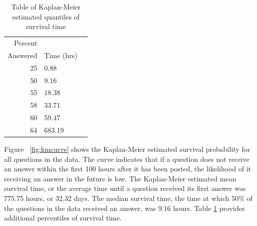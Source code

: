 \documentclass{article}
\begin{document}
\begin{table}[!h]
\centering
\begin{tabular}{rlr}
  \hline
 Percent\\ Answered & Time (hrs) \\ 
  \hline
  25 & 0.88 \\ 
  50 & 9.16 \\ 
  55 & 18.38 \\ 
  58 & 33.71 \\ 
  60 & 59.47 \\ 
  64 & 683.19 \\ 
   \hline
\end{tabular}
\caption{Table of Kaplan-Meier estimated quantiles of survival time}
\label{table:quantiles}
\end{table}

  Figure  ~\ref{fig:kmcurve} shows the Kaplan-Meier estimated survival probability for all questions in the data. The curve indicates that if a question does not receive an answer within the first 100 hours after it has been posted, the likelihood of it receiving an answer in the future is low. The Kaplan-Meier estimated mean survival time, or the average time until a question received its first answer was 775.75 hours, or 32.32 days. The median survival time, the time at which 50\% of the questions in the data received an answer, was 9.16 hours. Table \ref{table:quantiles} provides additional percentiles of survival time.
\end{document}
